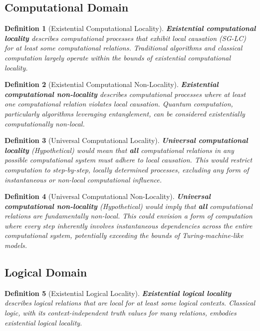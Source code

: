 \documentclass{article}
\newtheorem{definition}{Definition}
\begin{document}
	\subsection{Computational Domain}
	
	\begin{definition}[Existential Computational Locality]
		\textbf{Existential computational locality} describes computational processes that exhibit local causation (SG-LC) for at least some computational relations.  Traditional algorithms and classical computation largely operate within the bounds of existential computational locality.
	\end{definition}
	
	\begin{definition}[Existential Computational Non-Locality]
		\textbf{Existential computational non-locality} describes computational processes where at least one computational relation violates local causation. Quantum computation, particularly algorithms leveraging entanglement, can be considered existentially computationally non-local.
	\end{definition}
	
	\begin{definition}[Universal Computational Locality]
		\textbf{Universal computational locality} (Hypothetical) would mean that \textbf{all} computational relations in any possible computational system must adhere to local causation. This would restrict computation to step-by-step, locally determined processes, excluding any form of instantaneous or non-local computational influence.
	\end{definition}
	
	\begin{definition}[Universal Computational Non-Locality]
		\textbf{Universal computational non-locality} (Hypothetical) would imply that \textbf{all} computational relations are fundamentally non-local.  This could envision a form of computation where every step inherently involves instantaneous dependencies across the entire computational system, potentially exceeding the bounds of Turing-machine-like models.
	\end{definition}
	
	\subsection{Logical Domain}
	
	\begin{definition}[Existential Logical Locality]
		\textbf{Existential logical locality} describes logical relations that are local for at least some logical contexts. Classical logic, with its context-independent truth values for many relations, embodies existential logical locality.
	\end{definition}
	
\end{document}
